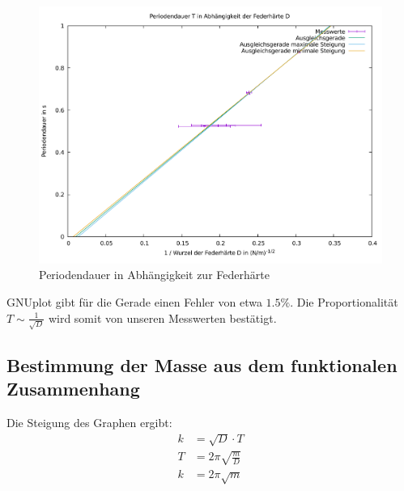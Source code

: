 \begin{figure}[H]
\includegraphics[width=\textwidth]{data/change_hardness.pdf}
\caption{Periodendauer in Abhängigkeit zur Federhärte}
\end{figure}

GNUplot gibt für die Gerade einen Fehler von etwa $1.5\%$. Die Proportionalität $T \sim \frac{1}{\sqrt{D}}$ wird somit von unseren Messwerten bestätigt.

\subsection{Bestimmung der Masse aus dem funktionalen Zusammenhang}
Die Steigung des Graphen ergibt:
\begin{align*}
k &= \sqrt{D} \cdot T \\
T &= 2\pi\sqrt{\frac{m}{D}} \\
k &= 2\pi\sqrt{m}
\end{align*}
 
